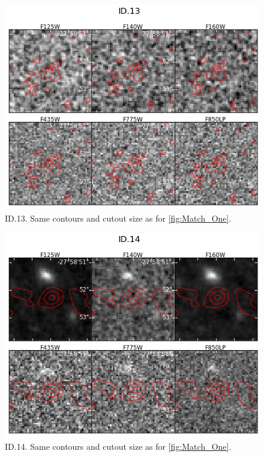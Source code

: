 \begin{figure}[tbp]
\centering \includegraphics[width=160mm]{Matched/ASPECS_Cutout_12.jpg}
\caption{ID.13. Same contours and cutout size as for \ref{fig:Match_One}.}
\label{fig:Match_Three}
\end{figure}

\begin{figure}[tbp]
\centering \includegraphics[width=160mm]{Matched/ASPECS_Cutout_13.jpg}
\caption{ID.14. Same contours and cutout size as for \ref{fig:Match_One}.}
\label{fig:Match_Three}
\end{figure}

